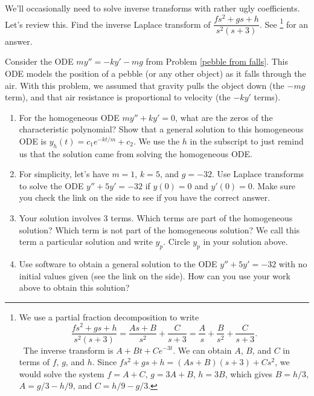 \begin{review*}
We'll occasionally need to solve inverse transforms with rather ugly coefficients.  Let's review this.
Find the inverse Laplace transform of 
$\dfrac{fs^2+gs+h}{s^2(s+3)}$. See \footnote{
We use a partial fraction decomposition to write 
$$\dfrac{fs^2+gs+h}{s^2(s+3)} = \frac{As+B}{s^2}+\frac{C}{s+3} = \frac{A}{s}+\frac{B}{s^2}+\frac{C}{s+3}. $$\
The inverse transform is $A+Bt+Ce^{-3t}$. We can obtain $A$, $B$, and $C$ in terms of $f$, $g$, and $h$. Since $fs^2+gs+h = (As+B)(s+3) + Cs^2$, we would solve the system $f=A+C$, $g=3A+B$, $h=3B$, which gives $B=h/3$, $A=g/3-h/9$, and $C=h/9-g/3$. 
} for an answer.
\end{review*}

\begin{problem}%
 Consider the ODE $my''=-ky'-mg$ from Problem \ref{pebble from falls}.  This ODE models the position of a pebble (or any other object) as it falls through the air. With this problem, we assumed that gravity pulls the object down (the $-mg$ term), and that air resistance is proportional to velocity (the $-ky'$ terms). 
\begin{enumerate}
 \item For the homogeneous ODE $my''+ky'=0$, what are the zeros of the characteristic polynomial? Show that a general solution to this homogeneous ODE is $y_h(t) = c_1e^{-kt/m} + c_2$. We use the $h$ in the subscript to just remind us that the solution came from solving the homogeneous ODE. 
 \item
{}%
For simplicity, let's have $m=1$, $k=5$, and $g=-32$. Use Laplace transforms to solve the ODE $y''+5y'=-32$ if $y(0)=0$ and $y'(0)=0$. Make sure you check the link on the side to see if you have the correct answer. 
 \item Your solution involves 3 terms. Which terms are part of the homogeneous solution?  Which term is not part of the homogeneous solution? We call this term a particular solution and write $y_p$. Circle $y_p$ in your solution above. 
 \item
{}%
 Use software to obtain a general solution to the ODE $y''+5y'=-32$ with no initial values given (see the link on the side). How can you use your work above to obtain this solution?
\end{enumerate}
\end{problem}

